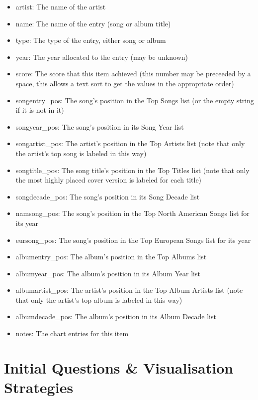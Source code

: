 \documentclass[12pt]{article}
\begin{document}
  \begin{itemize}
    \item artist: The name of the artist
    \item name: The name of the entry (song or album title)
    \item type: The type of the entry, either song or album
    \item year: The year allocated to the entry (may be unknown)
    \item score: The score that this item achieved (this number may be preceeded by a space, this allows a text sort to get the values in the appropriate order)
    \item songentry\_pos: The song's position in the Top Songs list (or the empty string if it is not in it)
    \item songyear\_pos: The song's position in its Song Year list
    \item songartist\_pos: The artist's position in the Top Artists list (note that only the artist's top song is labeled in this way)
    \item songtitle\_pos: The song title's position in the Top Titles list (note that only the most highly placed cover version is labeled for each title)
    \item songdecade\_pos: The song's position in its Song Decade list
    \item namsong\_pos: The song's position in the Top North American Songs list for its year
    \item eursong\_pos: The song's position in the Top European Songs list for its year
    \item albumentry\_pos: The album's position in the Top Albums list
    \item albumyear\_pos: The album's position in its Album Year list
    \item albumartist\_pos: The artist's position in the Top Album Artists list (note that only the artist's top album is labeled in this way)
    \item albumdecade\_pos: The album's position in its Album Decade list
    \item notes: The chart entries for this item
  \end{itemize}

  \section{Initial Questions \& Visualisation Strategies}
\end{document}
